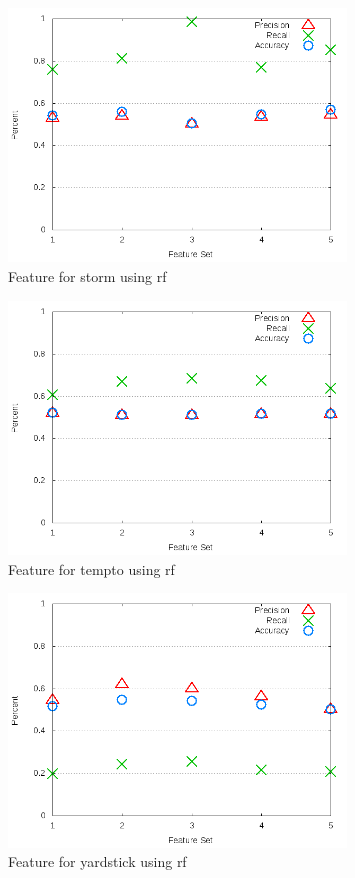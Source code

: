 \begin{figure}[!t]
\centering
\includegraphics[width=0.8\textwidth]{images/rf/test_3/storm_sample_range.png}
\caption{Feature for storm using \gls{rf}}
\label{fig:test_3_storm_rf}
\end{figure}

\clearpage
\begin{figure}[!t]
\centering
\includegraphics[width=0.8\textwidth]{images/rf/test_3/tempto_sample_range.png}
\caption{Feature for tempto using \gls{rf}}
\label{fig:test_3_tempto_rf}
\end{figure}

\begin{figure}[!t]
\centering
\includegraphics[width=0.8\textwidth]{images/rf/test_3/yardstick_sample_range.png}
\caption{Feature for yardstick using \gls{rf}}
\label{fig:test_3_yardstick_rf}
\end{figure}

